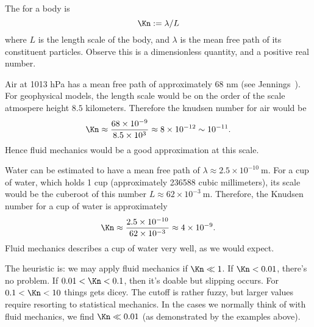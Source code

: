 \begin{node}
\begin{definition}\label{fluids:describing-000C}%
The  for a body is
\begin{equation}
\Kn := \lambda/L
\end{equation}
where $L$ is the length scale of the body, and $\lambda$ is the mean
free path of its constituent particles. Observe this is a dimensionless
quantity, and a positive real number.

\begin{example}\label{fluids:describing-000E}%
Air at 1013 hPa has a mean free path of approximately 68 nm (see
Jennings~\cite{jennings1988air}). For geophysical models, the length
scale would be on the order of the scale atmospere height $8.5$
kilometers. Therefore the knudsen number for air would be
\begin{equation}
\Kn\approx\frac{68\times 10^{-9}}{8.5\times 10^{3}}\approx8\times 10^{-12}\sim10^{-11}.
\end{equation}
Hence fluid mechanics would be a good approximation at this scale.
\end{example}

\begin{example}\label{fluids:describing-000G}%
Water can be estimated to have a mean free path of
$\lambda\approx2.5\times10^{-10}~\mathrm{m}$. For a cup of water, which
holds 1 cup (approximately 236588 cubic millimeters), its scale would be
the cuberoot of this number $L\approx 62\times10^{-3}~\mathrm{m}$.
Therefore, the Knudsen number for a cup of water is approximately
\begin{equation}
\Kn\approx\frac{2.5\times10^{-10}}{62\times10^{-3}}\approx4\times10^{-9}.
\end{equation}
Fluid mechanics describes a cup of water very well, as we would expect.
\end{example}
\end{definition}

\begin{node}\label{fluids:describing-000D}%
The heuristic is: we may apply fluid mechanics if $\Kn\ll1$. If
$\Kn<0.01$, there's no problem. If $0.01<\Kn<0.1$, then it's
doable but slipping occurs. For $0.1<\Kn<10$ things gets dicey. The
cutoff is rather fuzzy, but larger values require resorting to
statistical mechanics. In the cases we normally think of with fluid
mechanics, we find $\Kn\ll0.01$ (as demonstrated by the examples above).
\end{node} %


\end{node}
